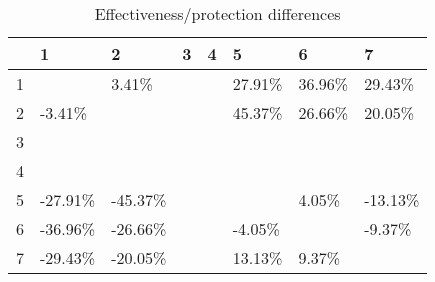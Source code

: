 \begin{table}[ht]
\centering
\begin{tabular}{rlllllll}
  \hline
 & 1 & 2 & 3 & 4 & 5 & 6 & 7 \\ 
  \hline
1 &  & 3.41\% &  &  & 27.91\% & 36.96\% & 29.43\% \\ 
  2 & -3.41\% &  &  &  & 45.37\% & 26.66\% & 20.05\% \\ 
  3 &  &  &  &  &  &  &  \\ 
  4 &  &  &  &  &  &  &  \\ 
  5 & -27.91\% & -45.37\% &  &  &  & 4.05\% & -13.13\% \\ 
  6 & -36.96\% & -26.66\% &  &  & -4.05\% &  & -9.37\% \\ 
  7 & -29.43\% & -20.05\% &  &  & 13.13\% & 9.37\% &  \\ 
   \hline
\end{tabular}
\caption{Effectiveness/protection differences} 
\end{table}
